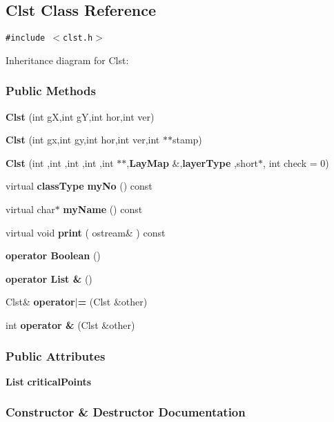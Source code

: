 \subsection{Clst  Class Reference}
\label{Clst}
{\tt \#include $<$clst.h$>$}

Inheritance diagram for Clst:\begin{figure}[H]
\begin{center}
\leavevmode
\setlength{\epsfysize}{4cm}
\end{center}
\end{figure}
\subsubsection*{Public Methods}
\begin{CompactItemize}
\item 
{\bf Clst} (int g\-X,int g\-Y,int hor,int ver)
\item 
{\bf Clst} (int gx,int gy,int hor,int ver,int $\ast$$\ast$stamp)
\item 
{\bf Clst} (int ,int ,int ,int ,int $\ast$$\ast$,{\bf Lay\-Map} \&,{\bf layer\-Type} ,short$\ast$, int check = 0)
\item 
virtual {\bf class\-Type} {\bf my\-No} () const
\item 
virtual char$\ast$ {\bf my\-Name} () const
\item 
virtual void {\bf print} ( ostream\& ) const
\item 
{\bf operator Boolean} ()
\item 
{\bf operator List \&} ()
\item 
Clst\& {\bf operator$|$=} (Clst \&other)
\item 
int {\bf operator \&} (Clst \&other)
\end{CompactItemize}
\subsubsection*{Public Attributes}
\begin{CompactItemize}
\item 
{\bf List} {\bf critical\-Points}
\end{CompactItemize}


\subsubsection{Constructor \& Destructor Documentation}
\label{Clst_a0}
